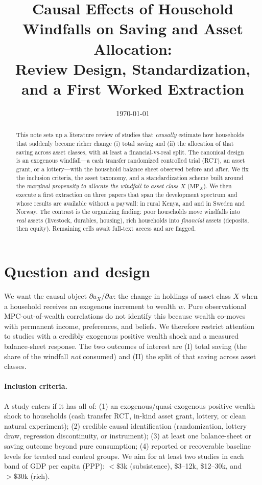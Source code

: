 \documentclass[11pt,a4paper]{article}
\title{Causal Effects of Household Windfalls on Saving and Asset Allocation:\\
\large Review Design, Standardization, and a First Worked Extraction}
\author{}
\date{\today}
\newcommand{\mpx}{\mathrm{MP}}
\begin{document}
\maketitle

\begin{abstract}
\noindent This note sets up a literature review of studies that \emph{causally}
estimate how households that suddenly become richer change (i) total saving and
(ii) the allocation of that saving across asset classes, with at least a
financial-vs-real split. The canonical design is an exogenous windfall---a cash
transfer randomized controlled trial (RCT), an asset grant, or a lottery---with
the household balance sheet observed before and after. We fix the inclusion
criteria, the asset taxonomy, and a standardization scheme built around the
\emph{marginal propensity to allocate the windfall to asset class $X$}
($\mpx_X$). We then execute a first extraction on three papers that span the
development spectrum and whose results are available without a paywall:
\citet{haushofer2016short} in rural Kenya, and \citet{briggs2021windfall} and
\citet{fagereng2021mpc} in Sweden and Norway. The contrast is the organizing
finding: poor households move windfalls into \emph{real} assets (livestock,
durables, housing), rich households into \emph{financial} assets (deposits,
then equity). Remaining cells await full-text access and are flagged.
\end{abstract}

\section{Question and design}

We want the causal object $\partial a_X / \partial w$: the change in holdings of
asset class $X$ when a household receives an exogenous increment to wealth $w$.
Pure observational MPC-out-of-wealth correlations do not identify this because
wealth co-moves with permanent income, preferences, and beliefs. We therefore
restrict attention to studies with a credibly exogenous positive wealth shock and
a measured balance-sheet response. The two outcomes of interest are (I) total
saving (the share of the windfall \emph{not} consumed) and (II) the split of that
saving across asset classes.

\paragraph{Inclusion criteria.} A study enters if it has all of: (1) an
exogenous/quasi-exogenous positive wealth shock to households (cash transfer RCT,
in-kind asset grant, lottery, or clean natural experiment); (2) credible causal
identification (randomization, lottery draw, regression discontinuity, or
instrument); (3) at least one balance-sheet or saving outcome beyond pure
consumption; (4) reported or recoverable baseline levels for treated and control
groups. We aim for at least two studies in each band of GDP per capita (PPP):
$<\!\$3$k (subsistence), \$3--12k, \$12--30k, and $>\!\$30$k (rich).
\end{document}
